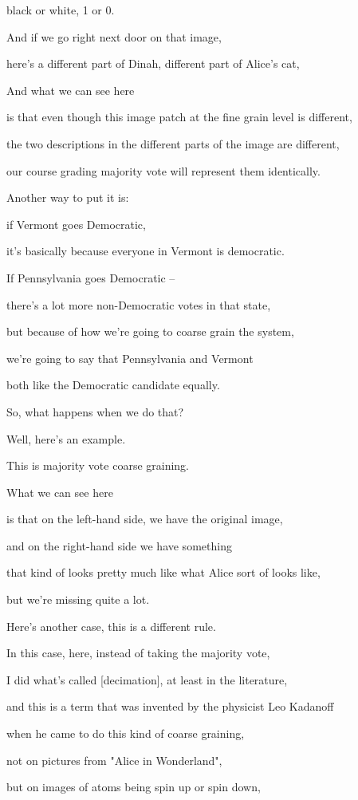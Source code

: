 \documentclass[]{article}
\begin{document}
black or white, 1 or 0.

And if we go right next door
on that image,

here's a different part of Dinah,
different part of Alice's cat,

And what we can see here

is that even though this image patch
at the fine grain level is different,

the two descriptions in the different
parts of the image are different,

our course grading majority vote
will represent them identically.

Another way to put it is:

if Vermont goes Democratic,

it's basically because
everyone in Vermont is democratic.

If Pennsylvania goes Democratic –

there's a lot more non-Democratic
votes in that state,

but because of how we're going
to coarse grain the system,

we're going to say
that Pennsylvania and Vermont

both like the Democratic
candidate equally.

So, what happens when we do that?

Well, here's an example.

This is majority vote coarse graining.

What we can see here

is that on the left-hand side,
we have the original image,

and on the right-hand side
we have something

that kind of looks pretty much
like what Alice sort of looks like,

but we're missing quite a lot.

Here's another case,
this is a different rule.

In this case, here, instead of
taking the majority vote,

I did what's called [decimation],
at least in the literature,

and this is a term that was invented
by the physicist Leo Kadanoff

when he came to do
this kind of coarse graining,

not on pictures
from "Alice in Wonderland",

but on images of atoms
being spin up or spin down,
\end{document}
